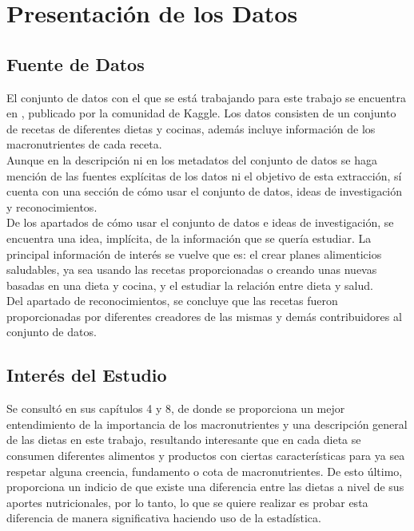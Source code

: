 \documentclass[12pt,a4paper]{article}
\begin{document}
\newpage

\tableofcontents

\newpage

\section{Presentación de los Datos}

    \subsection{Fuente de Datos}
    El conjunto de datos con el que se está trabajando para este trabajo 
    se encuentra en \cite{dataset_macronutrients}, publicado por la comunidad 
    de Kaggle. Los datos consisten de un conjunto de recetas de diferentes 
    dietas y cocinas, además incluye información de los macronutrientes de 
    cada receta.\\
    \cite{dataset_macronutrients} Aunque en la descripción ni en los metadatos del conjunto de datos se 
    haga mención de las fuentes explícitas de los datos ni el objetivo de 
    esta extracción, sí cuenta con una sección de cómo usar el conjunto de 
    datos, ideas de investigación y reconocimientos.\\
    De los apartados de cómo usar el conjunto de datos e ideas de investigación, 
    se encuentra una idea, implícita, de la información que se quería estudiar. 
    La principal información de interés se vuelve que es: el crear planes 
    alimenticios saludables, ya sea usando las recetas proporcionadas o creando 
    unas nuevas basadas en una dieta y cocina, y el estudiar la relación entre 
    dieta y salud.\\
    Del apartado de reconocimientos, se concluye que las recetas fueron 
    proporcionadas por diferentes creadores de las mismas y demás contribuidores 
    al conjunto de datos. 

    \subsection{Interés del Estudio}
    Se consultó \cite{marvastipopular} en sus 
    capítulos 4 y 8, de donde se proporciona un mejor entendimiento de la 
    importancia de los macronutrientes y una descripción general de las 
    dietas en este trabajo, resultando interesante que en cada dieta se 
    consumen diferentes alimentos y productos con ciertas características 
    para ya sea respetar alguna creencia, fundamento o cota de macronutrientes. 
    De esto último, proporciona un indicio de que existe una diferencia entre 
    las dietas a nivel de sus aportes nutricionales, por lo tanto, lo que se 
    quiere realizar es probar esta diferencia de manera significativa haciendo 
    uso de la estadística.
\end{document}
